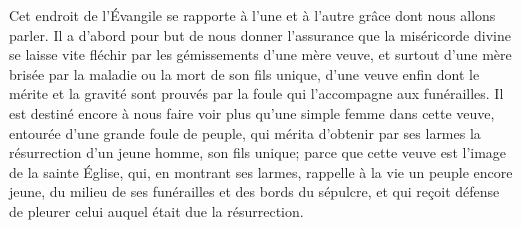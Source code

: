 Cet endroit de l’Évangile
	se rapporte à l’une et à l’autre grâce dont nous allons parler.
Il a d’abord pour but de nous donner l’assurance
	que la miséricorde divine se laisse vite fléchir
		par les gémissements d’une mère veuve,
	et surtout d’une mère brisée par la maladie ou la mort de son fils unique,
	d’une veuve enfin dont le mérite et la gravité
		sont prouvés par la foule qui l’accompagne aux funérailles.
Il est destiné encore
		à nous faire voir plus qu’une simple femme dans cette veuve,
	entourée d’une grande foule de peuple,
	qui mérita d’obtenir par ses larmes
		la résurrection d’un jeune homme, son fils unique;
	parce que cette veuve est l’image de la sainte Église,
	qui, en montrant ses larmes,
	rappelle à la vie un peuple encore jeune,
	du milieu de ses funérailles et des bords du sépulcre,
	et qui reçoit défense de pleurer celui auquel était due la résurrection.
